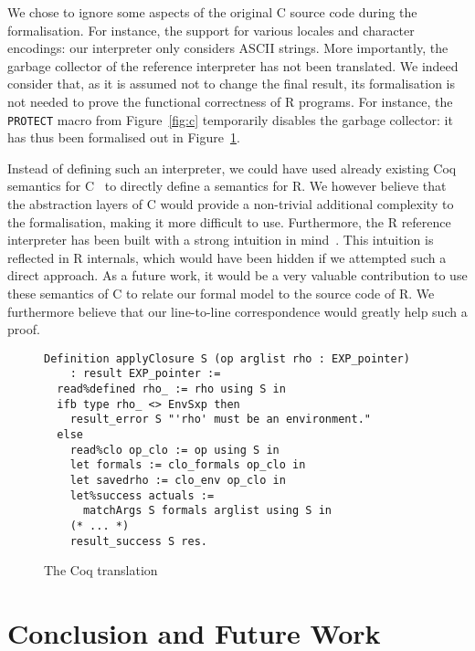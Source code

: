 \documentclass[9pt, sigplan, natbib=false, screen=true]{acmart}
\newcommand\Coq{Coq}
\newcommand\R{R}
\newcommand\Cn{C}
\begin{document}
We chose to ignore some aspects of the original \Cn{} source code
during the formalisation.
For instance, the support for various locales and character encodings:
our interpreter only considers ASCII strings.
More importantly, the garbage collector of the reference interpreter
has not been translated.
We indeed consider that, as it is assumed not to change the final result,
its formalisation is not needed to prove the functional correctness
of \R{} programs.
For instance,
the \texttt{PROTECT} macro from Figure~\ref{fig:c}
temporarily disables the garbage collector:
it has thus been formalised out in Figure~\ref{fig:coq}.

Instead of defining such an interpreter,
we could have used already existing \Coq{} semantics
for \Cn{}~\parencite{formalin, Leroy-Compcert-CACM}
to directly define a semantics for \R{}.
We however believe that the abstraction layers of \Cn{}
would provide a non-trivial additional complexity to the formalisation,
making it more difficult to use.
Furthermore, the \R{} reference interpreter has been built
with a strong intuition in mind~\parencite{ihaka1996r}.
This intuition is reflected in \R{} internals,
which would have been hidden if we attempted such a direct approach.
%
As a future work, it would be a very valuable contribution
to use these semantics of \Cn{} to relate
our formal model to the source code of \R{}.
We furthermore believe that our line-to-line correspondence
would greatly help such a proof.

\begin{figure}
\begin{verbatim}
Definition applyClosure S (op arglist rho : EXP_pointer)
    : result EXP_pointer :=
  read%defined rho_ := rho using S in
  ifb type rho_ <> EnvSxp then
    result_error S "'rho' must be an environment."
  else
    read%clo op_clo := op using S in
    let formals := clo_formals op_clo in
    let savedrho := clo_env op_clo in
    let%success actuals :=
      matchArgs S formals arglist using S in
    (* ... *)
    result_success S res.
\end{verbatim}
    \caption{The \Coq{} translation}
    \label{fig:coq}
\end{figure}


\section{Conclusion and Future Work}
\label{sec:conclusion}
\end{document}

